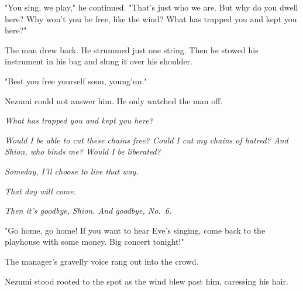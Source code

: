 "You sing, we play," he continued. "That's just who we are. But why do
you dwell here? Why won't you be free, like the wind?
What has trapped you and kept you here?"

The man drew back. He strummed just one string. Then he
stowed his instrument in his bag and slung it over his shoulder.

"Best you free yourself soon, young'un."

Nezumi could not answer him. He only watched the man off.

\emph{What has trapped you and kept you here?}

\emph{Would I be able to cut these chains free? Could I cut my chains of
hatred? And Shion, who binds me? Would I be liberated?}

\emph{Someday, I'll choose to live that way.}

\emph{That day will come.}

\emph{Then it's goodbye, Shion. And goodbye, No.~6.}

"Go home, go home! If you want to hear Eve's singing, come back to the
playhouse with some money. Big concert tonight!"

The manager's gravelly voice rang out into the crowd.

Nezumi stood rooted to the spot as the wind blew past him, caressing his
hair.